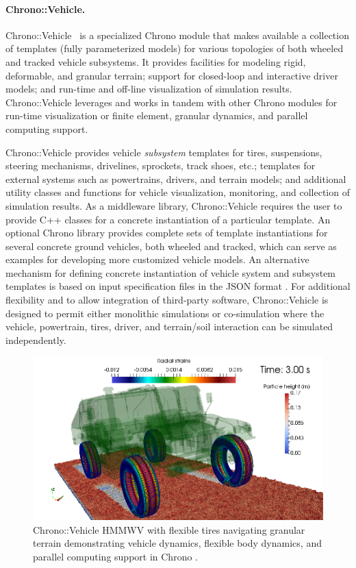 \documentclass[12pt,twocolumn]{article}
\begin{document}
\paragraph{Chrono::Vehicle.} Chrono::Vehicle~\cite{ChronoVehicle2019} is a specialized Chrono module that makes available a collection of templates (fully parameterized models) for various topologies of both wheeled and tracked vehicle subsystems. It provides facilities for modeling rigid, deformable, and granular terrain; support for closed-loop and interactive driver models; and run-time and off-line visualization of simulation results. Chrono::Vehicle leverages and works in tandem with other Chrono modules for run-time visualization or finite element, granular dynamics, and parallel computing support.

Chrono::Vehicle provides vehicle \textit{subsystem} templates for tires, suspensions, steering mechanisms, drivelines, sprockets, track shoes, etc.; templates for external systems such as powertrains, drivers, and terrain models; and additional utility classes and functions for vehicle visualization, monitoring, and collection of simulation results.  As a middleware library, Chrono::Vehicle requires the user to provide C++ classes for a concrete instantiation of a particular template.  An optional Chrono library provides complete sets of template instantiations for several concrete ground vehicles, both wheeled and tracked, which can serve as examples for developing more customized vehicle models. An alternative mechanism for defining concrete instantiation of vehicle system and subsystem templates is based on input specification files in the JSON format \cite{json}.  For additional flexibility and to allow integration of third-party software, Chrono::Vehicle is designed to permit either monolithic simulations or co-simulation where the vehicle, powertrain, tires, driver, and terrain/soil interaction can be simulated independently.

\begin{figure}
    \centering
    \includegraphics[width=0.8\columnwidth]{Figs/HMMWV-Granular.png}
    \caption{{\small Chrono::Vehicle HMMWV with flexible tires navigating granular terrain demonstrating vehicle dynamics, flexible body dynamics, and parallel computing support in Chrono \cite{antonioVehicleTireGranMatSim2017}.}}   
    \label{fig:hmmwvgranular}
\end{figure}
\end{document}
